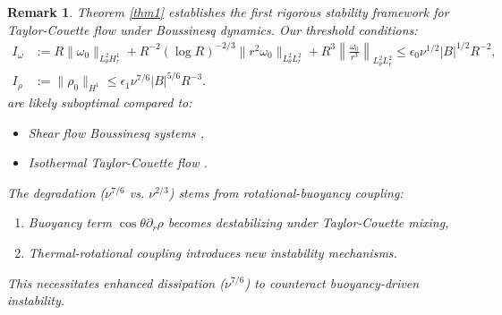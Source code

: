 \documentclass[final, 12pt,reqno]{amsart}
\newtheorem{remark}{\bf Remark}[section]
\numberwithin{equation}{section}
\begin{document}
\begin{remark}
Theorem \ref{thm1} establishes \textit{the first rigorous stability framework} for Taylor-Couette flow under Boussinesq dynamics. Our threshold conditions:
\begin{equation}
\begin{aligned}
I_\omega &:= R\|\omega_0\|_{L_\theta^2 H_r^1} + R^{-2}(\log R)^{-2/3}\|r^2\omega_0\|_{L_\theta^2 L_r^2} + R^3\left\|\frac{\omega_0}{r^3}\right\|_{L_\theta^2 L_r^2} \leq \epsilon_0\nu^{1/2}|B|^{1/2}R^{-2} \label{thresh1}, \\
I_\rho &:= \|\rho_0\|_{H^1} \leq \epsilon_1\nu^{7/6}|B|^{5/6}R^{-3}. 
\end{aligned}
\end{equation}
are likely suboptimal compared to:
\begin{itemize}
\item Shear flow Boussinesq systems \cite{Bian.2022,Deng.2021,Niu2024,Zillinger.2021,Zillinger.20210101,Zillinger.2023},
\item Isothermal Taylor-Couette flow \cite{An.2024}.
\end{itemize}
The degradation ($\nu^{7/6}$ vs. $\nu^{2/3}$) stems from \textit{rotational-buoyancy coupling}:
\begin{enumerate}
\item Buoyancy term $\cos\theta\partial_r\rho$ becomes destabilizing under Taylor-Couette mixing,
\item Thermal-rotational coupling introduces new instability mechanisms.
\end{enumerate}
This necessitates enhanced dissipation ($\nu^{7/6}$) to counteract buoyancy-driven instability.
\end{remark}
\end{document}
